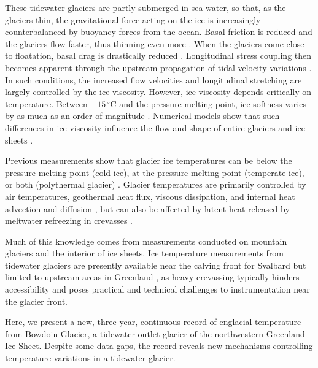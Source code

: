 \documentclass[utf8]{article}
\begin{document}
    These tidewater glaciers are partly submerged in sea water, so that, as the
    glaciers thin, the gravitational force acting on the ice is increasingly
    counterbalanced by buoyancy forces from the ocean. Basal friction is
    reduced and the glaciers flow faster, thus thinning even more
    \citep{Meier.Post.1987}. When the glaciers come close to floatation,
    basal drag is drastically reduced \citep{Shapero.etal.2016}.
    Longitudinal stress coupling then becomes apparent through the upstream
    propagation of tidal velocity variations \citep{Walters.1989,
    Walter.etal.2012, Sugiyama.etal.2014, Podolskiy.etal.2017,
    Seddik.etal.2019}. In such conditions, the increased flow velocities and
    longitudinal stretching are largely controlled by the ice viscosity.
    However, ice viscosity depends critically on temperature. Between
    $-15\,^\circ$C and the pressure-melting point, ice softness varies by as
    much as an order of magnitude \citep[p.~72]{Cuffey.Paterson.2010}.
    Numerical models show that such differences
    in ice viscosity influence the flow and shape of entire glaciers and ice
    sheets \citep[e.g. Figs.~2 and~7 of][]{Seguinot.etal.2016}.

    Previous measurements show that glacier ice temperatures can be below
    the pressure-melting point (cold ice), at the pressure-melting point
    (temperate ice), or both (polythermal glacier)
    \citep[p.~399]{Ahlmann.1935, Cuffey.Paterson.2010}. Glacier temperatures
    are primarily controlled by air temperatures, geothermal heat flux, viscous
    dissipation, and internal heat advection and diffusion \citep{Q-Robin.1955},
    but can also be affected by latent heat released by meltwater refreezing in
    crevasses \citep{Phillips.etal.2010, Phillips.etal.2013, Luthi.etal.2015}.

    Much of this knowledge comes from measurements conducted on mountain
    glaciers and the interior of ice sheets. Ice temperature measurements from
    tidewater glaciers are presently available near the calving front for
    Svalbard \citep{Jania.etal.1996} but limited to upstream areas in Greenland
    \citep{Iken.etal.1993, Luthi.etal.2002, Luthi.etal.2015, Doyle.etal.2018},
    as heavy crevassing typically hinders accessibility and poses practical and
    technical challenges to instrumentation near the glacier front.

    Here, we present a new, three-year, continuous record of englacial
    temperature from Bowdoin Glacier, a tidewater outlet
    glacier of the northwestern Greenland Ice Sheet. Despite some data gaps,
    the record reveals new mechanisms controlling temperature variations in a
    tidewater glacier.
\end{document}
